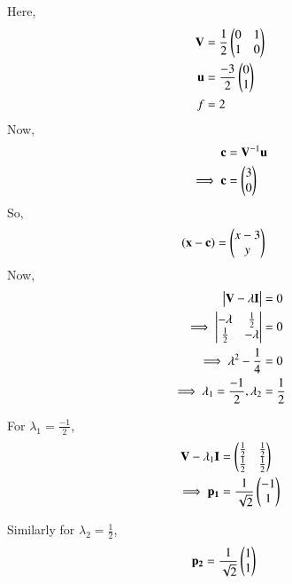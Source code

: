 \begin{enumerate}
    Here,
    \begin{align}
    \mathbf{V} &= \frac{1}{2}\begin{pmatrix}0 & 1 \\ 1 & 0\end{pmatrix} \\
    \mathbf{u} &= \frac{-3}{2}\begin{pmatrix}0 \\ 1\end{pmatrix} \\
    f &= 2
    \end{align}
    Now,
    \begin{align}
    \mathbf{c} &= \mathbf{V}^{-1}\mathbf{u}\\
    \implies \mathbf{c} &= \begin{pmatrix}3 \\ 0\end{pmatrix}
    \end{align}
    So,
    \begin{align}
    \left(\mathbf{x}-\mathbf{c}\right) &= \begin{pmatrix}x-3 \\ y\end{pmatrix}
    \end{align}
    Now,
    \begin{align}
        \begin{vmatrix}\mathbf{V}-\lambda\mathbf{I}\end{vmatrix} &= 0 \\
        \implies \begin{vmatrix}-\lambda & \frac{1}{2} \\ \frac{1}{2} & -\lambda\end{vmatrix} &= 0 \\
        \implies \lambda^2-\frac{1}{4} &= 0 \\
        \implies \lambda_1 =\frac{-1}{2},\lambda_2 &= \frac{1}{2}
    \end{align}
    
    For $\lambda_1=\frac{-1}{2}$,
    \begin{align}
        \mathbf{V}-\lambda_1\mathbf{I} &= \begin{pmatrix}\frac{1}{2} & \frac{1}{2} \\ \frac{1}{2} & \frac{1}{2}\end{pmatrix} \\
        \implies \mathbf{p_1} &= \frac{1}{\sqrt{2}}\begin{pmatrix}-1 \\ 1\end{pmatrix}
    \end{align}
    
    Similarly for $\lambda_2=\frac{1}{2}$,
    \begin{align}
        \mathbf{p_2} &= \frac{1}{\sqrt{2}}\begin{pmatrix}1 \\ 1\end{pmatrix}
    \end{align}
    

\end{enumerate}
